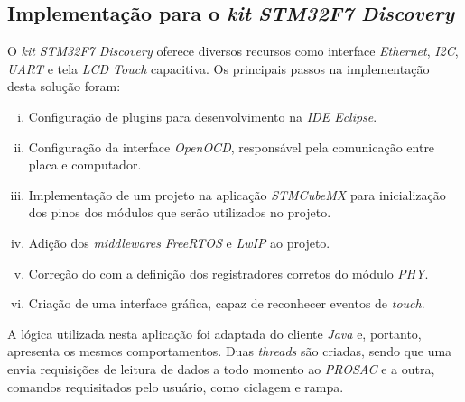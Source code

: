 \subsection {Implementação para o \textit{kit} \textit{STM32F7 Discovery}}

O \textit{kit} \textit{STM32F7 Discovery} oferece diversos recursos
como interface \textit{Ethernet}, \textit{I2C}, \textit{UART} e tela
\textit{LCD Touch} capacitiva. Os principais passos na implementação desta
solução foram:

\begin{enumerate} [i.]
  \item Configuração de plugins para desenvolvimento na \textit{IDE Eclipse}.
  \item Configuração da interface \textit{OpenOCD}, responsável pela comunicação
  entre placa e computador.
  \item Implementação de um projeto na aplicação \textit{STMCubeMX} para
  inicialização dos pinos dos módulos que serão utilizados no projeto.
  \item Adição dos \textit{middlewares} \textit{FreeRTOS} e \textit{LwIP} ao
  projeto.
  \item Correção do  com a definição dos
  registradores corretos do módulo \textit{PHY}.
  \item Criação de uma interface gráfica, capaz de reconhecer
  eventos de \textit{touch}.
\end{enumerate}

A lógica utilizada nesta aplicação foi adaptada do cliente \textit{Java} e,
portanto, apresenta os mesmos comportamentos. Duas \textit{threads} são criadas,
sendo que uma envia requisições de leitura de dados a todo momento ao
\textit{PROSAC} e a outra, comandos requisitados pelo usuário, como ciclagem e
rampa.
